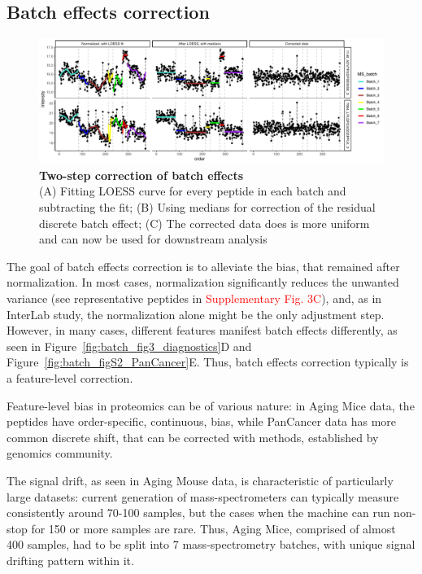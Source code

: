 \documentclass[num-refs]{wiley-article}
\begin{document}
\subsection{Batch effects correction}
\begin{figure}[hbt]
	\includegraphics[width=\textwidth]{figures/Fig5_batch_correction.pdf}
	
	\caption{\textbf{Two-step correction of batch effects}  \\
		\footnotesize
		(A) Fitting LOESS curve for every peptide in each batch and subtracting the fit; (B) Using medians for correction of the residual discrete batch effect; (C) The corrected data does is more uniform and can now be used for downstream analysis}
	\label{fig:batch_fig5_batchCorrection}
\end{figure}
The goal of batch effects correction is to alleviate the bias, that remained after normalization. In most cases, normalization significantly reduces the unwanted variance (see representative peptides in \textcolor{red}{Supplementary Fig. 3C}), and, as in InterLab study, the normalization alone might be the only adjustment step. However, in many cases, different features manifest batch effects differently, as seen in Figure~\ref{fig:batch_fig3_diagnostics}D and Figure~\ref{fig:batch_figS2_PanCancer}E. Thus, batch effects correction typically is a feature-level correction.

Feature-level bias in proteomics can be of various nature: in Aging Mice data, the peptides have order-specific, continuous, bias, while PanCancer data has more common discrete shift, that can be corrected with methods, established by genomics community. 

The signal drift, as seen in Aging Mouse data, is characteristic of particularly large datasets: current generation of mass-spectrometers can typically measure consistently around 70-100 samples, but the cases when the machine can run non-stop for 150 or more samples are rare. Thus, Aging Mice, comprised of almost 400 samples, had to be split into 7 mass-spectrometry batches, with unique signal drifting pattern within it.
\end{document}
